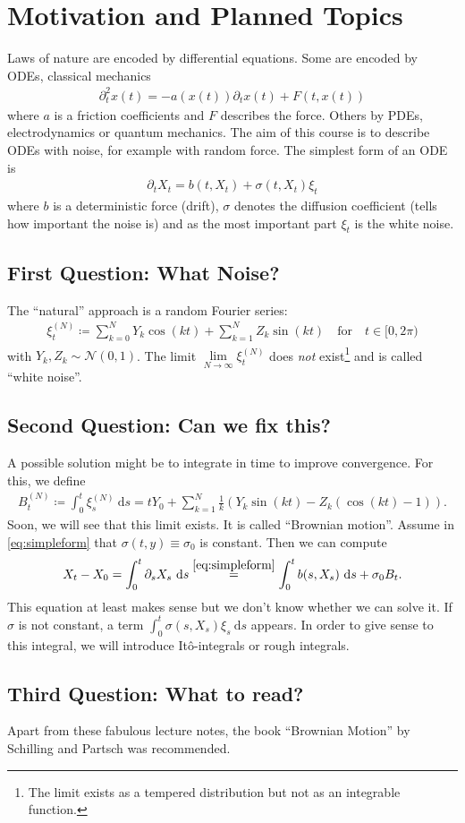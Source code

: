 \chapter{Motivation and Planned Topics}
Laws of nature are encoded by differential equations.
Some are encoded by ODEs, \eg classical mechanics
\begin{align*}
\partial_t^2 x(t)=-a(x(t))\partial_t x(t)+F(t,x(t))
\end{align*}
where $a$ is a friction coefficients and $F$ describes the force.
Others by PDEs, \eg electrodynamics or quantum mechanics.
The aim of this course is to describe ODEs with noise,
for example with random force.
The simplest form of an ODE is
\begin{align}\label{eq:simpleform}
\partial_t X_t=b(t,X_t)+\sigma(t,X_t)\xi_t
\end{align}
where $b$ is a deterministic force (drift),
$\sigma$ denotes the diffusion coefficient (tells how important the noise is)
and as the most important part $\xi_t$ is the white noise.

\section{First Question: What Noise?}

The “natural” approach is a random Fourier series:
\begin{align*}
\xi_t^{(N)}\coloneqq \sum_{k=0}^N Y_k \cos(kt)+ \sum_{k=1}^N Z_k \sin(kt)
\quad\text{for}\quad
t\in [0, 2\pi)
\end{align*}
with $Y_k,Z_k \sim \mathcal{N}(0,1)$.
The limit $\lim\limits_{N\to \infty} \xi_t^{(N)}$ does \emph{not} exist\footnote{
	The limit exists as a tempered distribution
	but not as an integrable function.
}
and is called “white noise”.

\section{Second Question: Can we fix this?}
A possible solution might be to integrate in time to improve convergence.
For this, we define
\begin{align*}
	B_t^{(N)} \coloneqq \int_0^t\xi_s^{(N)}~\mathrm{d}s
	=t Y_0+\sum_{k=1}^N \frac{1}{k}(Y_k\sin(kt)-Z_k(\cos(kt)-1)).
\end{align*}
Soon, we will see that this limit exists.
It is called “Brownian motion”.
Assume in \eqref{eq:simpleform} that $\sigma(t,y) \equiv \sigma_0$ is constant.
Then we can compute
\begin{align*}
	X_t-X_0 = \int_0^t \partial_s X_s~\mathrm{d}s
	\overset{\eqref{eq:simpleform}}{=}
	\int_0^t b(s,X_s)~\mathrm{d}s+\sigma_0 B_t.
\end{align*}
This equation at least makes sense but we don't know whether we can solve it.
If $\sigma$ is not constant, a term $\int_0^t\sigma(s,X_s)\xi_s~\mathrm{d}s$ appears.
In order to give sense to this integral, we will introduce It\^o-integrals or rough integrals.

\section{Third Question: What to read?}
Apart from these fabulous lecture notes,
the book “Brownian Motion” by Schilling and Partsch
was recommended.
